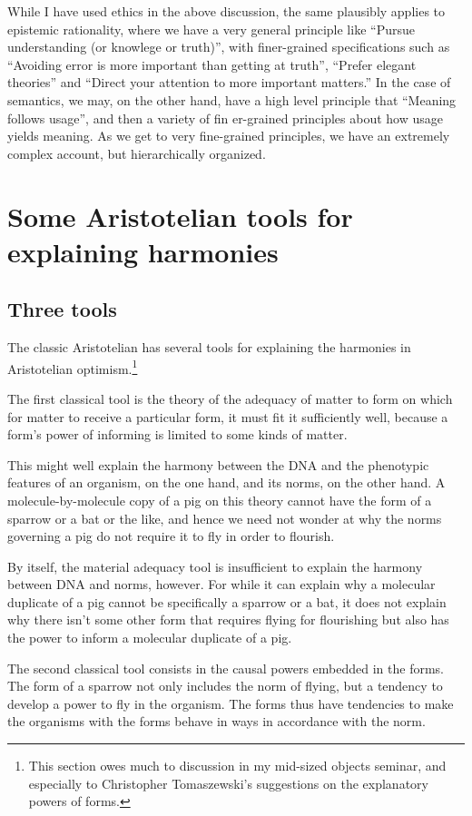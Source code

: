 While I have used ethics in the above discussion, the same plausibly applies to epistemic rationality, where we have a very general
principle like ``Pursue understanding (or knowlege or truth)'', with finer-grained specifications such as ``Avoiding error is more
important than getting at truth'', ``Prefer elegant theories'' and ``Direct your attention to more important matters.'' In the case
of semantics, we may, on the other hand, have a high level principle that ``Meaning follows usage'', and then a variety of fin er-grained 
principles about how usage yields meaning. As we get to very fine-grained principles, we have an extremely complex account, but hierarchically
organized.

\section{Some Aristotelian tools for explaining harmonies}
\subsection{Three tools}
The classic Aristotelian has several tools for explaining the harmonies in Aristotelian optimism.\footnote{This section owes much to discussion in my mid-sized objects seminar, and especially to Christopher Tomaszewski's suggestions on the explanatory powers of forms.}

The first classical tool is the theory of the adequacy of matter to form on which for matter to receive a particular 
form, it must fit it sufficiently well, because a form's power of informing is limited to some kinds of matter. 

This might well explain the harmony between the DNA and the phenotypic features of an organism, on the one hand, 
and its norms, on the other hand. A molecule-by-molecule copy of a pig on this theory cannot have the form of a sparrow or 
a bat or the like, and hence we need not wonder at why the norms governing a pig do not require it to fly in order to flourish.

By itself, the material adequacy tool is insufficient to explain the harmony between DNA and norms, however. For while 
it can explain why a molecular duplicate of a pig cannot be specifically a sparrow or a bat, it does not explain why there 
isn't some other form that requires flying for flourishing but also has the power to inform a molecular duplicate of a pig.

The second classical tool consists in the causal powers embedded in the forms. The form of a sparrow not only includes the 
norm of flying, but a tendency to develop a power to fly in the organism. The forms thus have tendencies to make the organisms
with the forms behave in ways in accordance with the norm.

